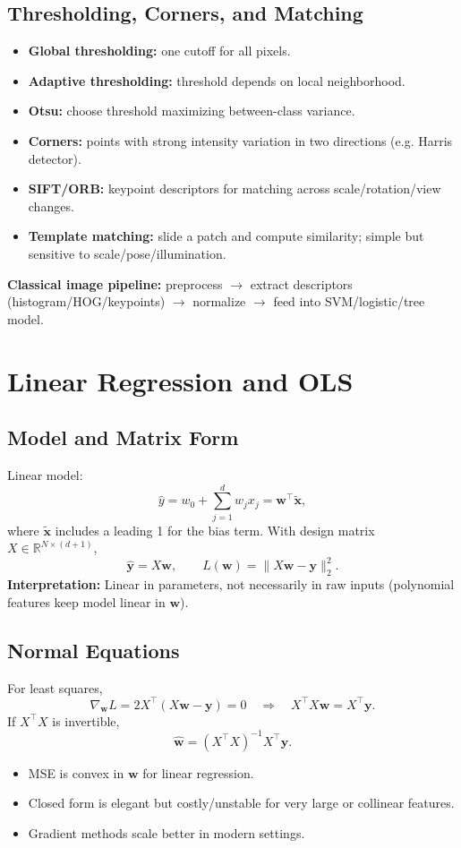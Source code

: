 \documentclass[10pt,twocolumn]{article}
\newcommand{\bbR}{\mathbb{R}}
\newcommand{\x}{\mathbf{x}}
\newcommand{\y}{\mathbf{y}}
\newcommand{\w}{\mathbf{w}}
\newcommand{\chead}[1]{\vspace{0.15em}\textbf{#1:} }
\begin{document}
\subsection{Thresholding, Corners, and Matching}
\begin{itemize}
  \item \textbf{Global thresholding:} one cutoff for all pixels.
  \item \textbf{Adaptive thresholding:} threshold depends on local neighborhood.
  \item \textbf{Otsu:} choose threshold maximizing between-class variance.
  \item \textbf{Corners:} points with strong intensity variation in two directions (e.g. Harris detector).
  \item \textbf{SIFT/ORB:} keypoint descriptors for matching across scale/rotation/view changes.
  \item \textbf{Template matching:} slide a patch and compute similarity; simple but sensitive to scale/pose/illumination.
\end{itemize}
\chead{Classical image pipeline} preprocess $\to$ extract descriptors (histogram/HOG/keypoints) $\to$ normalize $\to$ feed into SVM/logistic/tree model.

\section{Linear Regression and OLS}
\subsection{Model and Matrix Form}
Linear model:
\[
\hat y = w_0 + \sum_{j=1}^d w_j x_j = \w^\top \tilde{\x},
\]
where $\tilde{\x}$ includes a leading 1 for the bias term. With design matrix $X\in\bbR^{N\times (d+1)}$,
\[
\hat{\y}=X\w,\qquad L(\w)=\|X\w-\y\|_2^2.
\]
\chead{Interpretation} Linear in parameters, not necessarily in raw inputs (polynomial features keep model linear in $\w$).

\subsection{Normal Equations}
For least squares,
\[
\nabla_{\w}L = 2X^\top(X\w-\y)=0
\quad\Rightarrow\quad
X^\top X\w = X^\top\y.
\]
If $X^\top X$ is invertible,
\[
\hat{\w}=(X^\top X)^{-1}X^\top\y.
\]
\begin{itemize}
  \item MSE is convex in $\w$ for linear regression.
  \item Closed form is elegant but costly/unstable for very large or collinear features.
  \item Gradient methods scale better in modern settings.
\end{itemize}
\end{document}

